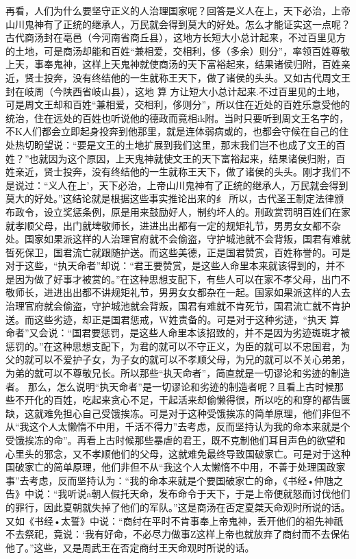 {{再看，人们为什么要坚守正义的人治理国家呢？回答是义人在上，天下必治，上帝山川鬼神有了正统的继承人，万民就会得到莫大的好处。怎么才能证实这一点呢？古代商汤封在亳邑（今河南省商丘县），这地方长短大小总计起来，不过百里见方的土地，可是商汤却能和百姓“兼相爱，交相利，侈（多余）则分”，率领百姓尊敬上天，事奉鬼神，这样上天鬼神就使商汤的天下富裕起来，结果诸侯归附，百姓亲近，贤士投奔，没有终结他的一生就称王天下，做了诸侯的头头。又如古代周文王封在岐周（今陕西省岐山县），这地
算
方让短大小总计起来.不过百里见的土地，可是周文王却和百姓“兼相爱，交相利，侈则分”，所以住在近处的百姓乐意受他的统治，住在远处的百姓也听说他的德政而竟相ik附。当时只要听到周文王名字的，不K人们都会立即起身投奔到他那里，就是连体弱病或的，也都会守候在自己的住处热切盼望说：“要是文王的土地扩展到我们这里，那末我们岂不也成了文王的百姓？”也就因为这个原因，上天鬼神就使文王的天下富裕起来，结果诸侯归附，百姓亲近，贤士投奔，没有终结他的一生就称王天下，做了诸侯的头头。刚才我们不是说过：“义人在上'，天下必治，上帝山川鬼神有了正统的继承人，万民就会得到莫大的好处。”这结论就是根据这些事实推论出来的纟
所以，古代圣王制定法律颁布政令，设立奖惩条例，原是用来鼓励好人，制约坏人的。刑政赏罚明百姓们在家就孝顺父母，出门就埤敬师长，进进出出都有一定的规矩礼节，男男女女都不杂处。国家如果派这样的人治理官府就不会偷盗，守护城池就不会背叛，国君有难就皙死保卫，国君流亡就跟随护送。而这些美德，正是国君赞赏，百姓称誉的。可是对于这些，“执天命者”却说：“君王要赞赏，是这些人命里本来就该得到的，并不是因为做了好事才被赏的。”在这种思想支配下，有些人可以在家不孝父母，出门不敬师长，进进出出都不讲规矩礼节，男男女女都杂在一起。国家如果派这样的人去治理官府就会偷盗，守护城池就会背叛，国君有难就不肯死节，国君流亡就不肯护送。而这些劣迹，却正是国君惩戒，W姓责备的。可是对于这种劣迹，“执天
算
命者”又会说：“国君要惩罚，是这些人命里本该招致的，并不是因为劣迹斑斑才被惩罚的。”在这种思想支配下，为君的就可以不守正义，为臣的就可以不忠国君，为父的就可以不爱护子女，为子女的就可以不孝顺父母，为兄的就可以不关心弟弟，为弟的就可以不尊敬兄长。所以那些“执天命者”，简直就是一切谬论和劣迹的制造者。
那么，怎么说明“执天命者”是一切谬论和劣迹的制造者呢？且看上古时候那些不开化的百姓，吃起来贪心不足，干起活来却偷懒得很，所以吃的和穿的都告匮缺，这就难免担心自己受饿挨冻。可是对于这种受饿挨冻的简单原理，他们非但不从“我这个人太懒惰不中用，千活不得力”去考虑，反而坚持认为我的命本来就是个受饿挨冻的命”。再看上古时候那些暴虐的君王，既不克制他们耳目声色的欲望和心里头的邪念，又不孝顺他们的父母，这就难免最终导致国破家亡。可是对于这种国破家亡的简单原理，他们非但不从“我这个人太懒惰不中用，不善于处理国政家事”去考虑，反而坚持认为：“我的命本来就是个要国破家亡的命，《书经•仲虺之告》中说：“我听说a朝人假托天命，发布命令于天下，于是上帝便就怒而讨伐他们的罪行，因此夏朝就失掉了他们的军队。”这是商汤在否定夏桀天命观时所说的话。又如《书经•太誓》中说：“商纣在平时不肯事奉上帝鬼神，丢开他们的祖先神祇不去祭祀，竟说：‘我有好命，不必尽力做事Z这样上帝也就放弃了商纣而不去保佑他了。”这些，又是周武王在否定商纣王天命观时所说的话。
}}
